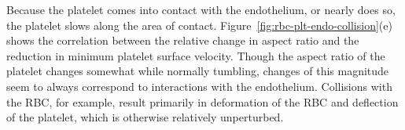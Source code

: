 Because the platelet comes into contact with the endothelium, or nearly does so, the
platelet slows along the area of contact. Figure~\ref{fig:rbc-plt-endo-collision}(e)
shows the correlation between the relative change in aspect ratio and the reduction in
minimum platelet surface velocity. Though the aspect ratio of the platelet changes
somewhat while normally tumbling, changes of this magnitude seem to always correspond to
interactions with the endothelium. Collisions with the RBC, for example, result primarily
in deformation of the RBC and deflection of the platelet, which is otherwise relatively
unperturbed.
